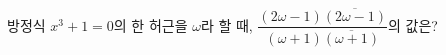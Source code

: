 방정식 $x^3+1=0$의 한 허근을 $\omega$라 할 때, $\dfrac{(2\omega-1)\overline{(2\omega-1)}}{(\omega+1)\overline{(\omega+1)}}$의 값은? 
